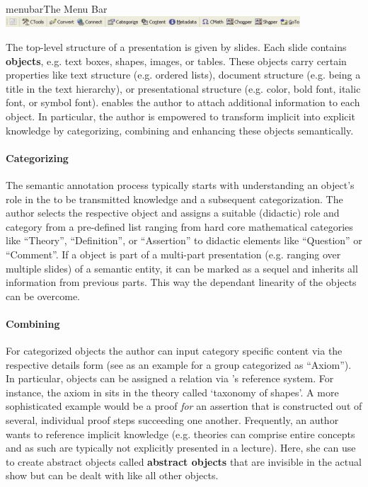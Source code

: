 \begin{myfig}{menubar}{The {\cpoint} Menu Bar}
  \includegraphics[width=11cm]{projects/cpoint/CPointMenuBar}
\end{myfig}

The top-level structure of a {\ppt} presentation is given by slides.  Each slide contains
{\bf {\ppt} objects}, e.g. text boxes, shapes, images, or tables. These objects carry
certain properties like text structure (e.g. ordered lists), document structure
(e.g. being a title in the text hierarchy), or presentational structure (e.g. color, bold
font, italic font, or symbol font). {\cpoint} enables the author to attach additional
information to each {\ppt} object. In particular, the author is empowered to transform
implicit into explicit knowledge by categorizing, combining and enhancing these objects semantically.

\paragraph{Categorizing}\label{sec:annotationform}
The semantic annotation process typically starts with understanding an object's role in
the to be transmitted knowledge and a subsequent categorization. The author selects the
respective {\ppt} object and assigns a suitable (didactic) role and category from a
pre-defined list ranging from hard core mathematical categories like ``Theory'',
``Definition'', or ``Assertion'' to didactic elements like ``Question'' or ``Comment''. If a {\ppt} object is part of a
multi-part presentation (e.g. ranging over multiple slides) of a semantic entity, it can
be marked as a sequel and inherits all information from previous parts. This way the
{\ppt} dependant linearity of the objects can be overcome.

\paragraph{Combining}\label{sec:detailsform}
For categorized {\ppt} objects the author can input category specific content via the
respective details form (see {} as an example for a {\ppt} group
categorized as ``Axiom''). In particular, {\ppt} objects can be assigned a relation via
{\cpoint}'s reference system. For instance, the axiom in {} sits in the
theory called `taxonomy of shapes'. A more sophisticated example would be a proof
{\emph{for}} an assertion that is constructed out of several, individual proof steps
succeeding one another.  Frequently, an author wants to reference implicit knowledge (e.g.
theories can comprise entire concepts and as such are typically not explicitly presented
in a lecture). Here, she can use {\cpoint} to create abstract {\ppt} objects called {\bf
  abstract objects} that are invisible in the actual {\ppt} show but can be dealt with like all other {\ppt} objects.

